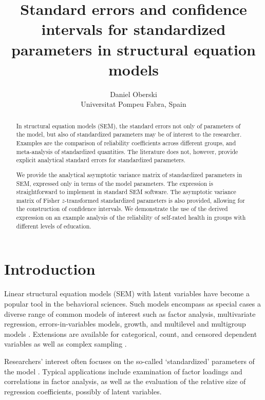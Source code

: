 \documentclass[a4paper,11pt]{article}
\title{Standard errors and confidence intervals for standardized parameters
 in structural equation models}
\author{Daniel Oberski\\Universitat Pompeu Fabra, Spain}
\newcommand{\0}{\boldsymbol{0}}
\begin{document}
\maketitle
\newpage

\begin{abstract}\noindent
In structural equation models (SEM), the standard errors not only of parameters of the model, but
also of standardized parameters may be of interest to the researcher. 
Examples are the comparison of reliability coefficients across different groups, and meta-analysis of 
standardized quantities.
The literature does not, however, provide explicit analytical standard errors 
for standardized parameters. %

We provide the analytical asymptotic variance matrix of standardized parameters in SEM, 
expressed only in terms of the model parameters. The expression is straightforward to 
implement in standard SEM software. 
The asymptotic variance matrix of Fisher $z$-transformed standardized parameters is also provided, 
allowing for the construction of confidence intervals.
We demonstrate the use of the derived expression on an example analysis of the
reliability of self-rated health in groups with different levels of education.
\end{abstract}

\section{Introduction\label{sec:introduction}}\noindent
Linear structural equation models (SEM) with latent variables
have become a popular tool in the behavioral sciences. Such models encompass as special cases a diverse range of common models of interest such as factor
analysis, multivariate regression, errors-in-variables models, growth, and
multilevel and multigroup models \citep{bollen1989structural}. Extensions are available for categorical, count,
and censored dependent variables as well as complex sampling 
 \citep{muthen1995complex,muthen2002beyond}.

Researchers' interest often focuses on the so-called 
`standardized' parameters of the model \citep{bollen1989structural}. Typical applications include examination of factor loadings and correlations in factor analysis, as well as the evaluation of the relative size of regression coefficients, possibly of latent variables.
\end{document}
